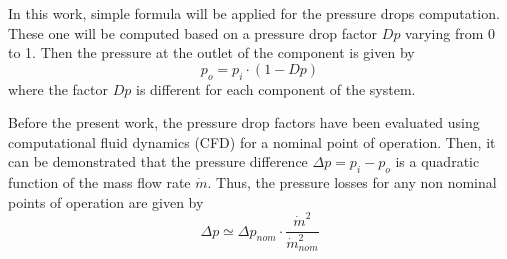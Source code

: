 In this work, simple formula will be applied for the pressure drops computation. These one will be computed based on a pressure drop factor $Dp$ varying from 0 to 1. Then the pressure at the outlet of the component is given by
\begin{equation}
p_{o} = p_{i}\cdot (1 - Dp)
\end{equation}
where the factor $Dp$ is different for each component of the system. 

Before the present work, the pressure drop factors have been evaluated using computational fluid dynamics (CFD) for a nominal point of operation. Then, it can be demonstrated that the pressure difference $\Delta p = p_{i} - p_{o}$ is a quadratic function of the mass flow rate $\dot{m}$. Thus, the pressure losses for any non nominal points of operation are given by
\begin{equation}
\Delta p \simeq \Delta p_{nom}\cdot \frac{\dot{m}^2}{\dot{m}^2_{nom}}
\end{equation}
%
%
%
%
